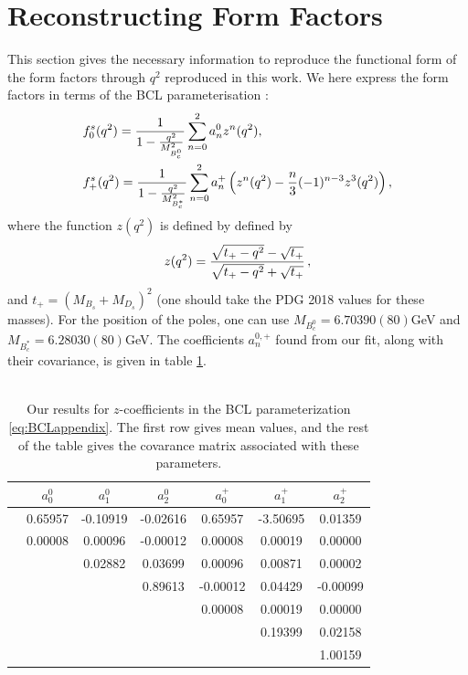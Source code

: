 \section{Reconstructing Form Factors}
\label{sec:reconstructing_formfactors}

This section gives the necessary information to reproduce the functional form of the form factors through $q^2$ reproduced in this work. We here express the form factors in terms of the BCL parameterisation \cite{Bourrely:2008za}:
\begin{align}
  \label{eq:BCLappendix}
  &f^s_0(q^2) = {1\over 1 - {q^2\over M_{B_c^0}^2} } \sum_{n=0}^{2} a_n^0 z^n(q^2), \\
  \nonumber
  &f^s_+(q^2) = {1\over 1 - {q^2\over M_{B_c^*}^2} } \sum_{n=0}^{2} a_n^+ \left( z^n(q^2) - {n\over 3} (-1)^{n-3} z^3(q^2) \right), \nonumber
\end{align}
where the function $z(q^2)$ is defined by defined by
\begin{align}
  z(q^2) = {\sqrt{t_+ - q^2} - \sqrt{t_+} \over \sqrt{t_+ - q^2} + \sqrt{t_+} }\,,
\end{align}
and $t_+ = (M_{B_s}+M_{D_s})^2$ (one should take the PDG 2018 values for these masses). For the position of the poles, one can use $M_{B_c^0} = 6.70390(80)$GeV and $M_{B_c^*} = 6.28030(80)$GeV. The coefficients $a_n^{0,+}$ found from our fit, along with their covariance, is given in table \ref{tab:coeffs}. \\ \\

\begin{table}[htb!]
  \begin{center}
    \begin{tabular}{ c c c c c c c }
      \hline
      & $a^0_0$ & $a^0_1$ & $a^0_2$ & $a^+_0$ & $a^+_1$ & $a^+_2$\\ [0.5ex]
      \hline
      & 0.65957 & -0.10919 & -0.02616 & 0.65957 & -3.50695 & 0.01359\\ [1ex]
      \hline
      & 0.00008 & 0.00096 & -0.00012 & 0.00008 & 0.00019 & 0.00000\\ [1ex]
      &  & 0.02882 & 0.03699 & 0.00096 & 0.00871 & 0.00002\\ [1ex]
      &  &  & 0.89613 & -0.00012 & 0.04429 & -0.00099\\ [1ex]
      &  &  &  & 0.00008 & 0.00019 & 0.00000\\ [1ex]
      &  &  &  &  & 0.19399 & 0.02158\\ [1ex]
      &  &  &  &  &  & 1.00159\\ [1ex]
      \hline
    \end{tabular}
    \caption{Our results for $z$-coefficients in the BCL parameterization \eqref{eq:BCLappendix}. The first row gives mean values, and the rest of the table gives the covarance matrix associated with these parameters. \label{tab:coeffs}}
  \end{center}
\end{table}



